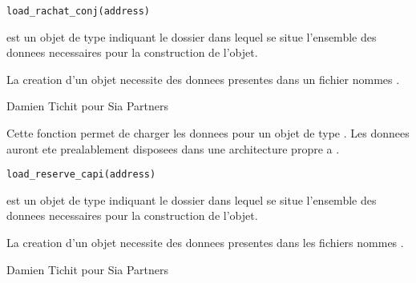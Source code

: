 \documentclass[a4paper]{book}
\begin{document}
%
\begin{Usage}
\begin{verbatim}
load_rachat_conj(address)
\end{verbatim}
\end{Usage}
%
\begin{Arguments}
\begin{ldescription}
\item[\code{address}] est un objet de type  indiquant le dossier dans lequel se situe l'ensemble des donnees necessaires
pour la construction de l'objet.
\end{ldescription}
\end{Arguments}
%
\begin{Details}\relax
La creation d'un objet  necessite des donnees presentes dans un fichier nommes .
\end{Details}
%
\begin{Author}\relax
Damien Tichit pour Sia Partners
\end{Author}
%
\begin{Description}\relax
Cette fonction permet de charger les donnees pour un objet de type . Les donnees auront ete prealablement disposees dans
une architecture propre a .
\end{Description}
%
\begin{Usage}
\begin{verbatim}
load_reserve_capi(address)
\end{verbatim}
\end{Usage}
%
\begin{Arguments}
\begin{ldescription}
\item[\code{address}] est un objet de type  indiquant le dossier dans lequel se situe l'ensemble des donnees necessaires
pour la construction de l'objet.
\end{ldescription}
\end{Arguments}
%
\begin{Details}\relax
La creation d'un objet  necessite des donnees presentes dans les fichiers nommes .
\end{Details}
%
\begin{Author}\relax
Damien Tichit pour Sia Partners
\end{Author}
\end{document}
